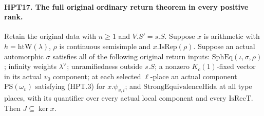 \documentclass[11pt,a4paper]{article}
\numberwithin{equation}{section}
\theoremstyle{remark}\newtheorem{remark}[theorem]{Remark}
\begin{document}
\paragraph{HPT17. The full original ordinary return theorem in every positive rank.}
\label{claim:HPT17}
Retain the original data with $n\geq1$ and $V.S'=s.S$.
Suppose $x$ is arithmetic with $h=\mathrm{htW}(\lambda)$,
$\rho$ is continuous semisimple and $x.\mathrm{IsRep}(\rho)$.
Suppose an actual automorphic $\sigma$ satisfies all of the
following original return inputs: $\mathrm{SphEq}(\iota,\sigma,\rho)$;
infinity weights $\lambda^\vee$; unramifiedness outside $s.S$;
a nonzero $K_c(1)$-fixed vector in its actual $v_0$ component;
at each selected $\ell$-place an actual component
$\mathrm{PS}(\omega_v)$ satisfying (HPT.3) for $x.\psi_{v,i}$;
and $\mathrm{StrongEquivalenceHida}$ at all type places, with
its quantifier over every actual local component and every
$\mathrm{IsRecT}$.  Then $J\subseteq\ker x$.
\end{document}
